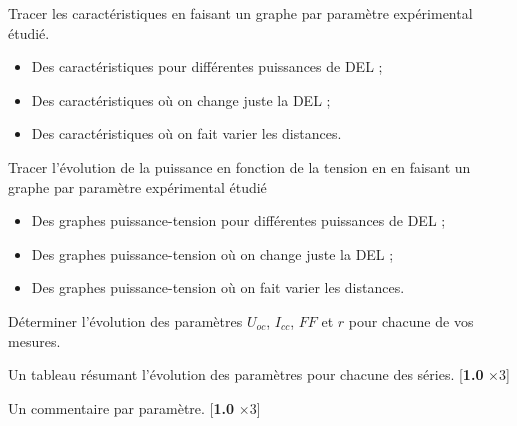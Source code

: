 \documentclass[twoside,a4paper,11pt,addpoints,answers]{exam}%
\newcounter{foo} %
\begin{document}
\begin{questions}

\setcounter{question}{\thefoo}

\question[3] Tracer les caractéristiques en faisant un graphe par paramètre expérimental étudié.

\begin{mybox}
\begin{solution}[5cm]

\begin{itemize}
\item Des caractéristiques pour différentes puissances de DEL ;
\item Des caractéristiques où on change juste la DEL ;
\item Des caractéristiques où on fait varier les distances.
\end{itemize}

\end{solution}
\end{mybox}

\question[3] Tracer l'évolution de la puissance en fonction de la tension en en faisant un graphe par paramètre expérimental étudié

\begin{mybox}
\begin{solution}[5cm]


\begin{itemize}
\item Des graphes puissance-tension pour différentes puissances de DEL ;
\item Des graphes puissance-tension où on change juste la DEL ;
\item Des graphes puissance-tension où on fait varier les distances.
\end{itemize}

\end{solution}
\end{mybox}

\question[3] Déterminer l'évolution des paramètres $U_{oc}$, $I_{cc}$, $FF$ et $r$ pour chacune de vos mesures.

\begin{mybox}
\begin{solution}[5cm]

Un tableau résumant l'évolution des paramètres pour chacune des séries. [\textbf{1.0} $\times 3$]

\end{solution}
\end{mybox}


\begin{mybox}
\begin{solution}[5cm]

Un commentaire par paramètre. [\textbf{1.0} $\times 3$]

\end{solution}
\end{mybox}

\setcounter{foo}{\value{question}}
\end{questions}
\end{document}
